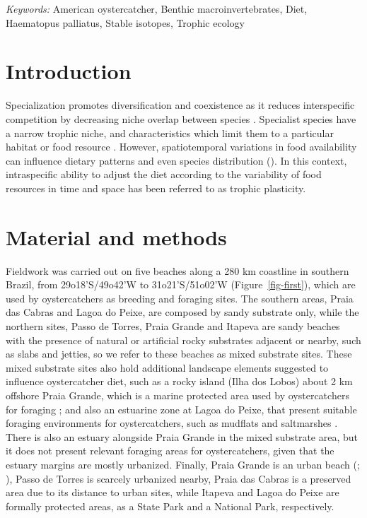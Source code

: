 \documentclass[
  12pt]{article}
\begin{document}
\noindent%
{\it Keywords:} American oystercatcher, Benthic
macroinvertebrates, Diet, Haematopus palliatus, Stable isotopes, Trophic
ecology
\vfill

\newpage
{} %
\ifdefined\Shaded\renewenvironment{Shaded}{\begin{tcolorbox}[enhanced, frame hidden, breakable, borderline west={3pt}{0pt}{shadecolor}, interior hidden, boxrule=0pt, sharp corners]}{\end{tcolorbox}}\fi

\hypertarget{sec-intro}{%
\section{Introduction}\label{sec-intro}}

Specialization promotes diversification and coexistence as it reduces
interspecific competition by decreasing niche overlap between species
\citep{chesson2000mechanisms}. Specialist species have a narrow trophic
niche, and characteristics which limit them to a particular habitat or
food resource \citep{amundsen1996new}. However, spatiotemporal
variations in food availability can influence dietary patterns and even
species distribution (\citep{hughes2000scale}). In this context,
intraspecific ability to adjust the diet according to the variability of
food resources in time and space has been referred to as trophic
plasticity.

\hypertarget{sec-meth}{%
\section{Material and methods}\label{sec-meth}}

Fieldwork was carried out on five beaches along a 280 km coastline in
southern Brazil, from 29o18'S/49o42'W to 31o21'S/51o02'W
(Figure~\ref{fig-first}), which are used by oystercatchers as breeding
and foraging sites. The southern areas, Praia das Cabras and Lagoa do
Peixe, are composed by sandy substrate only, while the northern sites,
Passo de Torres, Praia Grande and Itapeva are sandy beaches with the
presence of natural or artificial rocky substrates adjacent or nearby,
such as slabs and jetties, so we refer to these beaches as mixed
substrate sites. These mixed substrate sites also hold additional
landscape elements suggested to influence oystercatcher diet, such as a
rocky island (Ilha dos Lobos) about 2 km offshore Praia Grande, which is
a marine protected area used by oystercatchers for foraging
\citep{linhares2022american}; and also an estuarine zone at Lagoa do
Peixe, that present suitable foraging environments for oystercatchers,
such as mudflats and saltmarshes \citep{fedrizzi2008distribuiccao}.
There is also an estuary alongside Praia Grande in the mixed substrate
area, but it does not present relevant foraging areas for
oystercatchers, given that the estuary margins are mostly urbanized.
Finally, Praia Grande is an urban beach
(\citet{cristiano2016evaluation}; \citet{linhares2021breeding}), Passo
de Torres is scarcely urbanized nearby, Praia das Cabras is a preserved
area due to its distance to urban sites, while Itapeva and Lagoa do
Peixe are formally protected areas, as a State Park and a National Park,
respectively.
\end{document}
